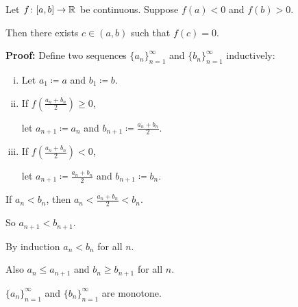 \documentclass[10pt,aspectratio=149]{beamer}
\begin{document}
\begin{frame}
\begin{lemma}
Let $f \colon [a,b] \to {\mathbb{R}}$ be continuous.
Suppose $f(a) < 0$ and $f(b) > 0$. 

\pause
Then there exists $c \in (a,b)$
such that $f(c) = 0$.
\end{lemma}

\pause
\textbf{Proof:}
Define two sequences $\{ a_n \}_{n=1}^\infty$
and $\{ b_n \}_{n=1}^\infty$ inductively:
\begin{enumerate}[(i)]
\item
\pause
Let $a_1 \coloneqq a$ and $b_1 \coloneqq b$.
\item
\pause
If $f\left(\frac{a_n+b_n}{2}\right) \geq 0$,

let $a_{n+1} \coloneqq a_n$ and
$b_{n+1} \coloneqq \frac{a_n+b_n}{2}$.
\item
\pause
If $f\left(\frac{a_n+b_n}{2}\right) < 0$,

let $a_{n+1} \coloneqq \frac{a_n+b_n}{2}$ and
$b_{n+1} \coloneqq b_n$.
\end{enumerate}

\pause
\vspace*{-1.2in}
\hspace*{2.4in}

\pause
\vspace*{-0.8in}
If $a_n < b_n$, then $a_n < \frac{a_n+b_n}{2} < b_n$.

\pause
So $a_{n+1} < b_{n+1}$.

\pause
By induction $a_n < b_n$ for all $n$.

\pause
\medskip

Also $a_n \leq a_{n+1}$ and $b_n \geq b_{n+1}$ for all $n$.

\pause
$\{a_n\}_{n=1}^\infty$ and $\{ b_n \}_{n=1}^\infty$ are monotone.

\end{frame}
\end{document}
